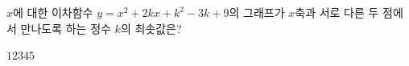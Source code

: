 $x$에 대한 이차함수 $y=x^2+2kx+k^2-3k+9$의 그래프가 $x$축과 서로 다른 두 점에서 만나도록 하는 정수 $k$의 최솟값은?
\begin{choices32}{$1$}{$2$}{$3$}{$4$}{$5$}\end{choices32}
